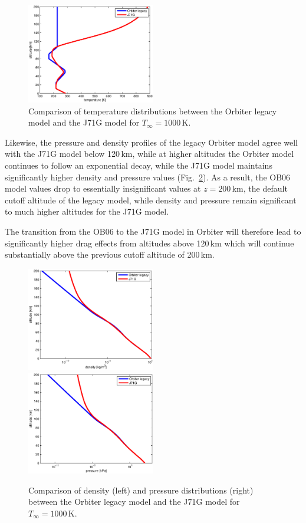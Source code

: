 \documentclass[a4paper]{article}
\begin{document}
\begin{figure}
\includegraphics[width=0.5\textwidth]{ob_j71g_temp.eps}
\caption{Comparison of temperature distributions between the Orbiter legacy model and the J71G model for $T_\infty=1000$\,K.}
\label{fig:ob_j71g_temp}
\end{figure}
Likewise, the pressure and density profiles of the legacy Orbiter model agree well with the J71G model below 120\,km, while at higher altitudes the Orbiter model continues to follow an exponential decay, while the J71G model maintains significantly higher density and pressure values (Fig.~\ref{fig:ob_j71g_dens_prs}).
As a result, the OB06 model values drop to essentially insignificant values at $z=200$\,km, the default cutoff altitude of the legacy model, while density and pressure remain significant to much higher altitudes for the J71G model.

The transition from the OB06 to the J71G model in Orbiter will therefore lead to significantly higher drag effects from altitudes above 120\,km which will continue substantially above the previous cutoff altitude of 200\,km.

\begin{figure}
\includegraphics[width=0.5\textwidth]{ob_j71g_dens.eps}
\includegraphics[width=0.5\textwidth]{ob_j71g_prs.eps}
\caption{Comparison of density (left) and pressure distributions (right) between the Orbiter legacy model and the J71G model for $T_\infty=1000$\,K.}
\label{fig:ob_j71g_dens_prs}
\end{figure}
\end{document}
